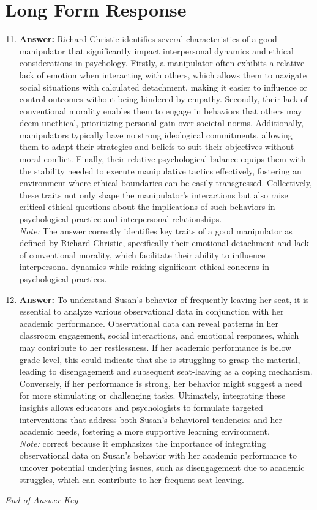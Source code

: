 \documentclass[12pt]{article}
\begin{document}
\section*{Long Form Response}
\begin{enumerate}[label=\arabic*.]
\setcounter{enumi}{10}
\item \textbf{Answer:} Richard Christie identifies several characteristics of a good manipulator that significantly impact interpersonal dynamics and ethical considerations in psychology. Firstly, a manipulator often exhibits a relative lack of emotion when interacting with others, which allows them to navigate social situations with calculated detachment, making it easier to influence or control outcomes without being hindered by empathy. Secondly, their lack of conventional morality enables them to engage in behaviors that others may deem unethical, prioritizing personal gain over societal norms. Additionally, manipulators typically have no strong ideological commitments, allowing them to adapt their strategies and beliefs to suit their objectives without moral conflict. Finally, their relative psychological balance equips them with the stability needed to execute manipulative tactics effectively, fostering an environment where ethical boundaries can be easily transgressed. Collectively, these traits not only shape the manipulator's interactions but also raise critical ethical questions about the implications of such behaviors in psychological practice and interpersonal relationships.
\\ \textit{Note:} The answer correctly identifies key traits of a good manipulator as defined by Richard Christie, specifically their emotional detachment and lack of conventional morality, which facilitate their ability to influence interpersonal dynamics while raising significant ethical concerns in psychological practices.
\item \textbf{Answer:} To understand Susan's behavior of frequently leaving her seat, it is essential to analyze various observational data in conjunction with her academic performance. Observational data can reveal patterns in her classroom engagement, social interactions, and emotional responses, which may contribute to her restlessness. If her academic performance is below grade level, this could indicate that she is struggling to grasp the material, leading to disengagement and subsequent seat-leaving as a coping mechanism. Conversely, if her performance is strong, her behavior might suggest a need for more stimulating or challenging tasks. Ultimately, integrating these insights allows educators and psychologists to formulate targeted interventions that address both Susan's behavioral tendencies and her academic needs, fostering a more supportive learning environment.
\\ \textit{Note:} correct because it emphasizes the importance of integrating observational data on Susan's behavior with her academic performance to uncover potential underlying issues, such as disengagement due to academic struggles, which can contribute to her frequent seat-leaving.
\end{enumerate}

\vfill
\noindent\textit{End of Answer Key}
\end{document}
